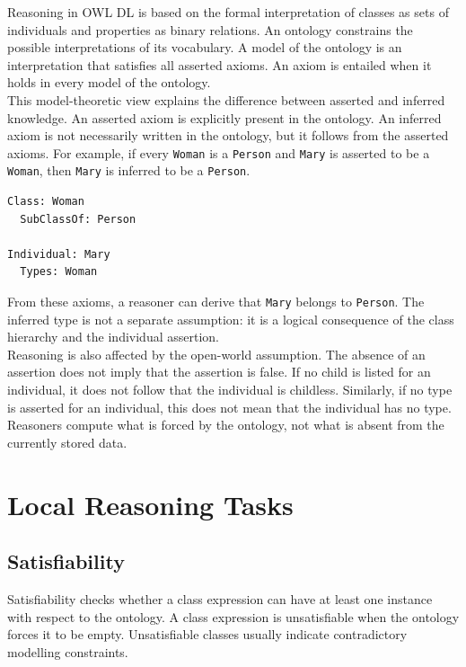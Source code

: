 \documentclass{scrbook}
\begin{document}
	Reasoning in OWL DL is based on the formal interpretation of classes as sets of individuals and properties as binary relations. An ontology constrains the possible interpretations of its vocabulary. A model of the ontology is an interpretation that satisfies all asserted axioms. An axiom is entailed when it holds in every model of the ontology.\\
	
	This model-theoretic view explains the difference between asserted and inferred knowledge. An asserted axiom is explicitly present in the ontology. An inferred axiom is not necessarily written in the ontology, but it follows from the asserted axioms. For example, if every \texttt{Woman} is a \texttt{Person} and \texttt{Mary} is asserted to be a \texttt{Woman}, then \texttt{Mary} is inferred to be a \texttt{Person}.
	
	\begin{lstlisting}
Class: Woman
  SubClassOf: Person

Individual: Mary
  Types: Woman
	\end{lstlisting}
	
	From these axioms, a reasoner can derive that \texttt{Mary} belongs to \texttt{Person}. The inferred type is not a separate assumption: it is a logical consequence of the class hierarchy and the individual assertion.\\
	
	Reasoning is also affected by the open-world assumption. The absence of an assertion does not imply that the assertion is false. If no child is listed for an individual, it does not follow that the individual is childless. Similarly, if no type is asserted for an individual, this does not mean that the individual has no type. Reasoners compute what is forced by the ontology, not what is absent from the currently stored data.
	
	\section{Local Reasoning Tasks}
	
	\subsection{Satisfiability}
	
	Satisfiability checks whether a class expression can have at least one instance with respect to the ontology. A class expression is unsatisfiable when the ontology forces it to be empty. Unsatisfiable classes usually indicate contradictory modelling constraints.
	
\end{document}
